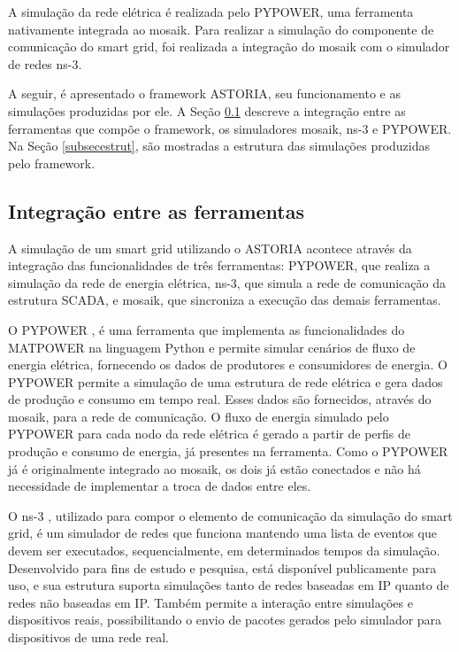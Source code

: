 \documentclass[cic,tc]{iiufrgs}
\begin{document}
A simulação da rede elétrica é realizada pelo PYPOWER, uma ferramenta nativamente integrada ao mosaik. Para realizar a simulação do componente de comunicação do smart grid, foi realizada a integração do mosaik com o simulador de redes ns-3.

A seguir, é apresentado o framework ASTORIA, seu funcionamento e as simulações produzidas por ele. A Seção \ref{subsecinteg} descreve a integração entre as ferramentas que compõe o framework, os simuladores mosaik, ns-3 e PYPOWER. Na Seção \ref{subsecestrut}, são mostradas a estrutura das simulações produzidas pelo framework.

\subsection{Integração entre as ferramentas}
\label{subsecinteg}
 
A simulação de um smart grid utilizando o ASTORIA acontece através da integração das funcionalidades de três ferramentas: PYPOWER, que realiza a simulação da rede de energia elétrica, ns-3, que simula a rede de comunicação da estrutura SCADA, e mosaik, que sincroniza a execução das demais ferramentas.
 
O PYPOWER \cite{pypower},  é uma ferramenta que implementa as funcionalidades do MATPOWER \cite{matpower} na linguagem Python e permite simular cenários de fluxo de energia elétrica, fornecendo os dados de produtores e consumidores de energia. O PYPOWER permite a simulação de uma estrutura de rede elétrica e gera dados de produção e consumo em tempo real. Esses dados são fornecidos, através do mosaik, para a rede de comunicação. O fluxo de energia simulado pelo PYPOWER para cada nodo da rede elétrica é gerado a partir de perfis de produção e consumo de energia, já presentes na ferramenta. Como o PYPOWER já é originalmente integrado ao mosaik, os dois já estão conectados e não há necessidade de implementar a troca de dados entre eles.

O ns-3 \cite{nsnam}, utilizado para compor o elemento de comunicação da simulação do smart grid, é um simulador de redes que funciona mantendo uma lista de eventos que devem ser executados, sequencialmente, em determinados tempos da simulação.  Desenvolvido para fins de estudo e pesquisa, está disponível publicamente para uso, e sua estrutura suporta simulações tanto de redes baseadas em IP quanto de redes não baseadas em IP. Também permite a interação entre simulações e dispositivos reais, possibilitando o envio de pacotes gerados pelo simulador para dispositivos de uma rede real.
 
\end{document}
